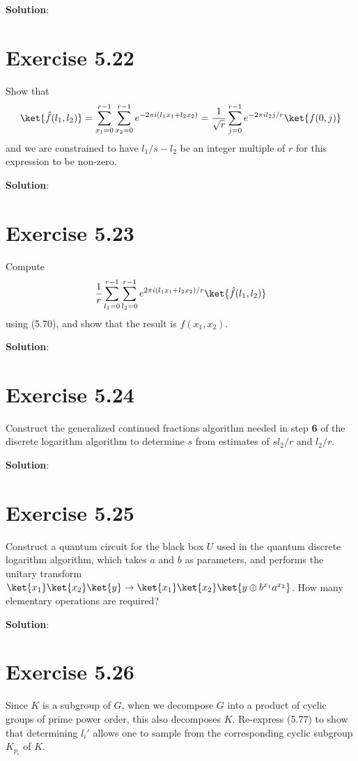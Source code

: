 \documentclass{book}
\begin{document}
    \textbf{Solution}:
    
\section*{Exercise 5.22}
    Show that
    \begin{align}
        \ket{\hat{f}(l_1,l_2)} = \sum_{x_1=0}^{r-1} \sum_{x_2 = 0}^{r-1}e^{-2\pi i(l_1x_1+l_2x_2)} = \frac{1}{\sqrt{r}} \sum_{j=0}^{r-1}e^{-2\pi i l_2 j /r}\ket{f(0,j)}
    \end{align}
    and we are constrained to have $l_1/s-l_2$ be an integer multiple of $r$ for this expression to be non-zero.
    
    \textbf{Solution}:
    
\section*{Exercise 5.23}
    Compute
    \begin{align}
        \frac{1}{r}\sum_{l_1=0}^{r-1}\sum_{l_2=0}^{r-1} e^{2\pi i (l_1x_1+l_2x_2)/r}\ket{\hat{f}(l_1,l_2)}
    \end{align}
    using (5.70), and show that the result is $f(x_1,x_2)$.
    
    \textbf{Solution}:
    
\section*{Exercise 5.24}
    Construct the generalized continued fractions algorithm needed in step \textbf{6} of the discrete logarithm algorithm to determine $s$ from estimates of $s l_2/r$ and $l_2/r$.
    
    \textbf{Solution}:
    
\section*{Exercise 5.25}
    Construct a quantum circuit for the black box $U$ used in the quantum discrete logarithm algorithm, which takes $a$ and $b$ as parameters, and performs the unitary transform $\ket{x_1}\ket{x_2}\ket{y}\rightarrow\ket{x_1}\ket{x_2}\ket{y\oplus b^{x_1}a^{x_2}}$. How many elementary operations are required?
    
    \textbf{Solution}:
    
\section*{Exercise 5.26}
    Since $K$ is a subgroup of $G$, when we decompose $G$ into a product of cyclic groups of prime power order, this also decomposes $K$. Re-express (5.77) to show that determining $l_i'$ allows one to sample from the corresponding cyclic subgroup $K_{p_i}$ of $K$.
    
\end{document}
